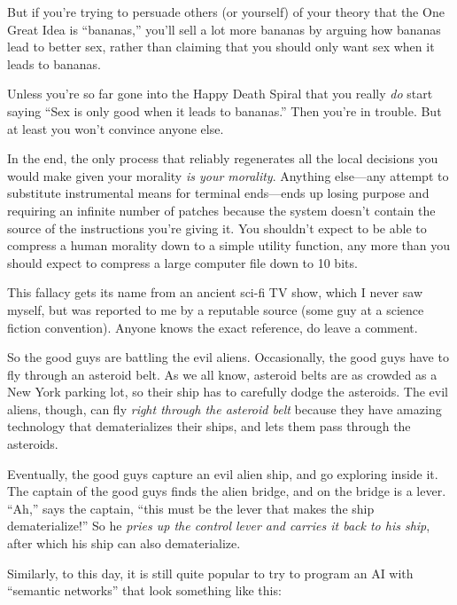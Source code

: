 {
 But if you're trying to persuade others (or
yourself) of your theory that the One Great Idea is
``bananas,'' you'll
sell a lot more bananas by arguing how bananas lead to better sex,
rather than claiming that you should only want sex when it leads to
bananas.}

{
 Unless you're so far gone into the Happy Death
Spiral that you really \textit{do} start saying ``Sex
is only good when it leads to bananas.'' Then
you're in trouble. But at least you
won't convince anyone else.}

{
 In the end, the only process that reliably regenerates all the
local decisions you would make given your morality \textit{is your
morality}. Anything else---any attempt to substitute instrumental means
for terminal ends---ends up losing purpose and requiring an infinite
number of patches because the system doesn't contain
the source of the instructions you're giving it. You
shouldn't expect to be able to compress a human
morality down to a simple utility function, any more than you should
expect to compress a large computer file down to 10 bits.}

\myendsectiontext


{
 This fallacy gets its name from an ancient sci-fi TV show, which I
never saw myself, but was reported to me by a reputable source (some
guy at a science fiction convention). Anyone knows the exact reference,
do leave a comment. }

{
 So the good guys are battling the evil aliens. Occasionally, the
good guys have to fly through an asteroid belt. As we all know,
asteroid belts are as crowded as a New York parking lot, so their ship
has to carefully dodge the asteroids. The evil aliens, though, can fly
\textit{right through the asteroid belt} because they have amazing
technology that dematerializes their ships, and lets them pass through
the asteroids.}

{
 Eventually, the good guys capture an evil alien ship, and go
exploring inside it. The captain of the good guys finds the alien
bridge, and on the bridge is a lever.
``Ah,'' says the captain,
``this must be the lever that makes the ship
dematerialize!'' So he \textit{pries up the control
lever and carries it back to his ship}, after which his ship can also
dematerialize.}

{
 Similarly, to this day, it is still quite popular to try to
program an AI with ``semantic
networks'' that look something like this:}

